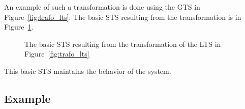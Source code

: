An example of such a transformation is done using the GTS in Figure~\ref{fig:trafo_lts}. The basic STS resulting from the transformation is in Figure~\ref{fig:trafo_basic_sts}.

\begin{figure}[h]
  \begin{center}
    
  \end{center}
  \caption{The basic STS resulting from the transformation of the LTS in Figure~\ref{fig:trafo_lts}}
  \label{fig:trafo_basic_sts}
\end{figure}

This basic STS maintains the behavior of the system.

\subsection{Example}\label{sec:gts_example}

